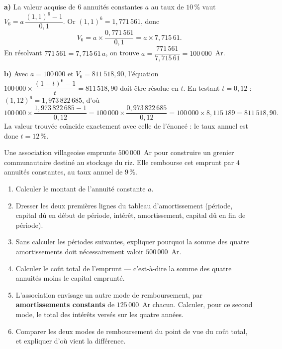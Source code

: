 \begin{corrige}[annales]
\textbf{a)} La valeur acquise de $6$ annuités constantes $a$ au taux de
$10\,\%$ vaut
$V_{6} = a\,\dfrac{(1{,}1)^{6}-1}{0{,}1}$. Or $(1{,}1)^{6} = 1{,}771\,561$,
donc
\[
  V_{6} = a \times \frac{0{,}771\,561}{0{,}1} = a \times 7{,}715\,61 .
\]
En résolvant $771\,561 = 7{,}715\,61\,a$, on trouve
$a = \dfrac{771\,561}{7{,}715\,61} = 100\,000$~Ar.

\textbf{b)} Avec $a = 100\,000$ et $V_{6} = 811\,518{,}90$, l'équation
$100\,000 \times \dfrac{(1+t)^{6}-1}{t} = 811\,518{,}90$ doit être résolue
en $t$. En testant $t = 0{,}12$ :
$(1{,}12)^{6} = 1{,}973\,822\,685$, d'où
\[
  100\,000 \times \frac{1{,}973\,822\,685-1}{0{,}12}
  = 100\,000 \times \frac{0{,}973\,822\,685}{0{,}12}
  = 100\,000 \times 8{,}115\,189
  = 811\,518{,}90 .
\]
La valeur trouvée coïncide exactement avec celle de l'énoncé : le taux
annuel est donc $t = 12\,\%$.
\end{corrige}

\begin{jecherche}
Une association villageoise emprunte $500\,000$~Ar pour construire un
grenier communautaire destiné au stockage du riz. Elle rembourse cet emprunt
par $4$ annuités constantes, au taux annuel de $9\,\%$.

\begin{enumerate}[label=\textbf{\arabic*.}, leftmargin=*, itemsep=0.3em]
  \item Calculer le montant de l'annuité constante $a$.
  \item Dresser les deux premières lignes du tableau d'amortissement
        (période, capital dû en début de période, intérêt, amortissement,
        capital dû en fin de période).
  \item Sans calculer les périodes suivantes, expliquer pourquoi la somme
        des quatre amortissements doit nécessairement valoir $500\,000$~Ar.
  \item Calculer le coût total de l'emprunt — c'est-à-dire la somme des
        quatre annuités moins le capital emprunté.
  \item L'association envisage un autre mode de remboursement, par
        \textbf{amortissements constants} de $125\,000$~Ar chacun. Calculer,
        pour ce second mode, le total des intérêts versés sur les quatre
        années.
  \item Comparer les deux modes de remboursement du point de vue du coût
        total, et expliquer d'où vient la différence.
\end{enumerate}
\end{jecherche}

